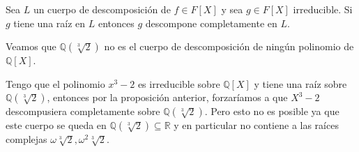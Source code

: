 \begin{proposition}
	Sea $L$ un cuerpo de descomposición de $f \in F[X]$ y sea $g \in F[X]$ irreducible. Si $g$ tiene una raíz en $L$ entonces $g$ descompone completamente en $L$. 
\end{proposition}

\begin{example}
	Veamos que $\mathbb{Q}(\sqrt[3]{2})$ no es el cuerpo de descomposición de ningún
	polinomio de $\mathbb{Q}[X]$.
	
	Tengo que el polinomio $x^3-2$ es irreducible sobre $\mathbb{Q}[X]$ y tiene una raíz sobre $\mathbb{Q}(\sqrt[3]{2})$, entonces por la proposición anterior, forzaríamos a que $X^3-2$ descompusiera completamente sobre $\mathbb{Q}(\sqrt[3]{2})$. Pero esto no es posible ya que este cuerpo se queda en $\mathbb{Q}(\sqrt[3]{2}) \subseteq \mathbb{R}$ y en particular no contiene a las raíces complejas $\omega \sqrt[3]{2},\omega^2 \sqrt[3]{2}$.
\end{example}
